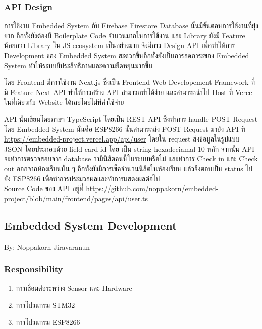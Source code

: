 \documentclass[fontsize=14pt]{extarticle}
\begin{document}
\subsubsection{API Design}
\par การใช้งาน Embedded System กับ Firebase Firestore Database นั้นมีขั้นตอนการใช้งานที่ยุ่งยาก อีกทั้งยังต้องมี Boilerplate Code จำนวนมากในการใช้งาน และ Library ยังมี Feature  น้อยกว่า Library ใน JS ecosystem เป็นอย่างมาก จึงมีการ Design API เพื่อทำให้การ Development ของ Embedded System สะดวกขึ้นอีกทั้งยังเป็นการลดภาระของ Embedded System ทำให้ระบบมีประสิทธิภาพและความยืดหยุ่นมากขึ้น
\par โดย Frontend มีการใช้งาน Next.js ซึ่งเป็น Frontend Web Developement Framework ที่มี Feature Next API ทำให้การสร้าง API สามารถทำได้ง่าย และสามารถนำไป Host ที่ Vercel ในที่เดียวกับ Website ได้เลยโดยไม่ทีค่าใช้จ่าย
\par API นั้นเขียนโดยภาษา TypeScript โดยเป็น REST API ซึ่งทำการ handle POST Request โดย Embedded System นั่นคือ ESP8266 นั้นสามารถส่ง POST Request มายัง API ที่ \url{https://embedded-project.vercel.app/api/user} โดยใน request ส่งข้อมูลในรูปแบบ JSON โดยประกอบด้วย field card id โดย เป็น string hexadeciamal 10 หลัก จากนั้น API จะทำการตรวจสอบจาก database ว่ามีนิสิตคนนี้ในระบบหรือไม่ และทำการ Check in และ Check out ออกจากห้องเรียนนั้น ๆ อีกทั้งยังมีการเช็คจำนวนนิสิตในห้องเรียน แล้วจึงตอบเป็น status ไปยัง ESP8266 เพื่อทำการประมวลผลและทำการแสดงผลต่อไป\\
Source Code ของ API อยู่ที่ \url{https://github.com/noppakorn/embedded-project/blob/main/frontend/pages/api/user.ts}
\pagebreak
\subsection{Embedded System Development}
By: Noppakorn Jiravaranun\\
\subsubsection{Responsibility}
\begin{enumerate}
    \item การเชื่อมต่อระหว่าง Sensor และ Hardware
    \item การโปรแกรม STM32
    \item การโปรแกรม ESP8266
\end{enumerate}
\end{document}

